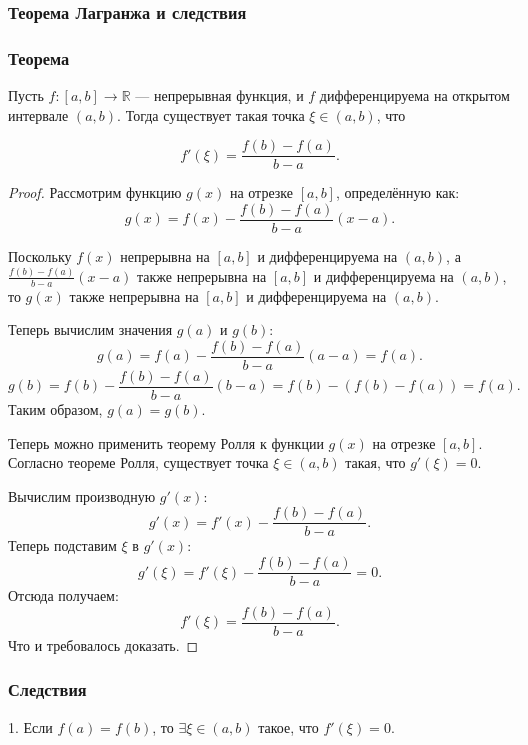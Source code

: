 \subsubsection{Теорема Лагранжа и следствия}

\subsubsection*{Теорема}
Пусть \( f : [a,b] \to \mathbb{R} \) — непрерывная функция, и \( f \) дифференцируема на открытом интервале \( (a,b) \). Тогда существует такая точка \( \xi \in (a,b) \), что

\[
f'(\xi) = \frac{f(b) - f(a)}{b - a}.
\]

\begin{proof}
    Рассмотрим функцию \( g(x) \) на отрезке \( [a, b] \), определённую как:
    \[
    g(x) = f(x) - \frac{f(b) - f(a)}{b - a} (x - a).
    \]
    
    Поскольку \( f(x) \) непрерывна на \( [a, b] \) и дифференцируема на \( (a, b) \), а \( \frac{f(b) - f(a)}{b - a} (x - a) \) также непрерывна на \( [a, b] \) и дифференцируема на \( (a, b) \), то \( g(x) \) также непрерывна на \( [a, b] \) и дифференцируема на \( (a, b) \).
    
    Теперь вычислим значения \( g(a) \) и \( g(b) \):
    \[
    g(a) = f(a) - \frac{f(b) - f(a)}{b - a} (a - a) = f(a).
    \]
    \[
    g(b) = f(b) - \frac{f(b) - f(a)}{b - a} (b - a) = f(b) - (f(b) - f(a)) = f(a).
    \]
    Таким образом, \( g(a) = g(b) \).
    
    Теперь можно применить теорему Ролля к функции \( g(x) \) на отрезке \( [a, b] \). Согласно теореме Ролля, существует точка \( \xi \in (a, b) \) такая, что \( g'(\xi) = 0 \).
    
    Вычислим производную \( g'(x) \):
    \[
    g'(x) = f'(x) - \frac{f(b) - f(a)}{b - a}.
    \]
    Теперь подставим \( \xi \) в \( g'(x) \):
    \[
    g'(\xi) = f'(\xi) - \frac{f(b) - f(a)}{b - a} = 0.
    \]
    Отсюда получаем:
    \[
    f'(\xi) = \frac{f(b) - f(a)}{b - a}.
    \]
    Что и требовалось доказать.
    \end{proof}


    \subsubsection*{Следствия}

    1. Если \( f(a) = f(b) \), то \( \exists \xi \in (a,b) \) такое, что \( f'(\xi) = 0 \).
    
